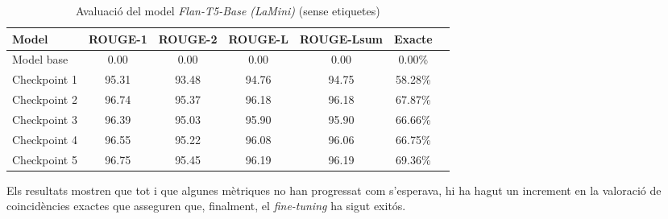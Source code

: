 \begin{table}[H]
    \centering
    \begin{tabular}{lcccccc}
    \toprule
    Model & ROUGE-1 & ROUGE-2 & ROUGE-L & ROUGE-Lsum & Exacte \\
    \midrule
    Model base   & 0.00  & 0.00  & 0.00  & 0.00  & 0.00\% \\
    Checkpoint 1 & 95.31 & 93.48 & 94.76 & 94.75 & 58.28\% \\
    Checkpoint 2 & 96.74 & 95.37 & 96.18 & 96.18 & 67.87\% \\
    Checkpoint 3 & 96.39 & 95.03 & 95.90 & 95.90 & 66.66\% \\
    Checkpoint 4 & 96.55 & 95.22 & 96.08 & 96.06 & 66.75\% \\
    Checkpoint 5 & 96.75 & 95.45 & 96.19 & 96.19 & 69.36\% \\
    \bottomrule
    \end{tabular}
    \caption[Avaluació del model \textit{Flan-T5-Base (LaMini)}]{Avaluació del model \textit{Flan-T5-Base (LaMini)} (sense etiquetes)}
\end{table}

Els resultats mostren que tot i que algunes mètriques no han progressat com s'esperava, hi ha hagut un increment en la valoració de coincidències exactes que asseguren que, finalment, el \textit{fine-tuning} ha sigut exitós.




